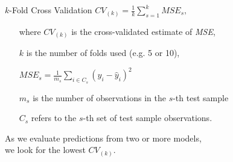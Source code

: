 \documentclass{beamer}
\begin{document}
\begin{frame}{$k$-Fold Cross Validation}
$ \textit{CV}_{(k)}= \frac{1}{k}\displaystyle\sum_{s=1}^{k} \textit{MSE}_s ,$
\vspace{0.3cm}
\begin{itemize}
\item [where] $\textit{CV}_{(k)}$ is the cross-validated estimate of \textit{MSE},
\item[ ] $k$ is the number of folds used (e.g. 5 or 10),
\item[ ] $\textit{MSE}_s = \frac{1}{m_s} \sum_{i \in C_s}^{}(y_i - \widehat{y}_i)^2 $ 
\item[ ] $m_s$ is the number of observations in the $s$-th test sample
\item[ ] $C_s$ refers to the $s$-th set of test sample  observations. 
\end{itemize}
\vspace{0.3cm}
As we evaluate predictions from two or more models, 
\\we look for the lowest $\textit{CV}_{(k)}$. 
\end{frame}
\end{document}
